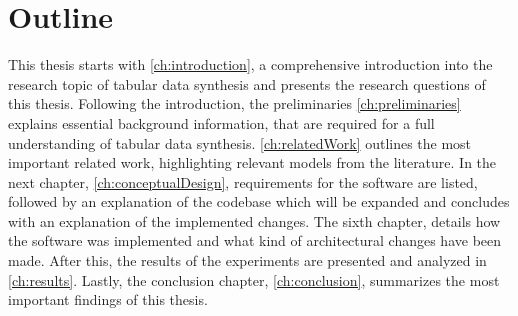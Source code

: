 
\section{Outline}
\label{ch:intro-outline}


This thesis starts with \autoref{ch:introduction}, a comprehensive introduction into the research topic of tabular data synthesis and presents the research questions of this thesis.
Following the introduction, the preliminaries \autoref{ch:preliminaries} explains essential background information, that are required for a full understanding of tabular data synthesis.
\autoref{ch:relatedWork} outlines the most important related work, highlighting relevant models from the literature.
In the next chapter, \autoref{ch:conceptualDesign}, requirements for the software are listed, followed by an explanation of the codebase which will be expanded and concludes with an explanation of the implemented changes.
The sixth chapter, details how the software was implemented and what kind of architectural changes have been made.
After this, the results of the experiments are presented and analyzed in \autoref{ch:results}.
Lastly, the conclusion chapter, \autoref{ch:conclusion}, summarizes the most important findings of this thesis.